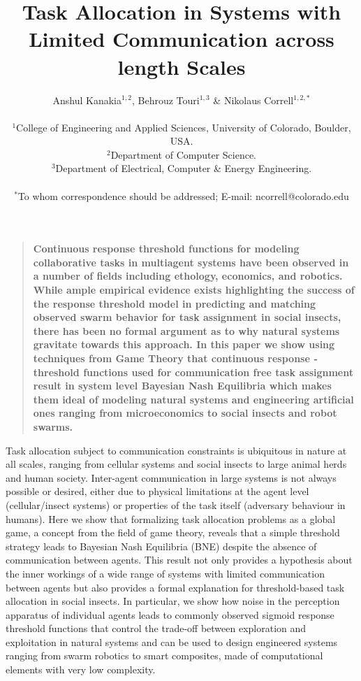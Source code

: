 \documentclass[12pt]{article}
\title{Task Allocation in Systems with Limited Communication across length Scales}
\author
{Anshul Kanakia$^{1,2}$, Behrouz Touri$^{1,3}$ \& Nikolaus Correll$^{1,2,\ast}$\\
\\
\normalsize{$^{1}$College of Engineering and Applied Sciences, University of Colorado, Boulder, USA. }\\
\normalsize{$^{2}$Department of Computer Science.}\\
\normalsize{$^{3}$Department of Electrical, Computer \& Energy Engineering.}\\
\\
\normalsize{$^\ast$To whom correspondence should be addressed; E-mail: ncorrell@colorado.edu}
}
\date{}
\newenvironment{sciabstract}{%
\begin{quote} \bf}
{\end{quote}}
\begin{document}
 


\baselineskip24pt


\maketitle 




\begin{sciabstract}
Continuous response ­threshold functions for modeling collaborative tasks in multi­agent systems have been observed in a number of fields including ethology, economics, and robotics. While ample empirical evidence exists highlighting the success of the response­ threshold model in predicting and matching observed swarm behavior for task ­assignment in social insects, there has been no formal argument as to why natural systems gravitate towards this approach. In this paper we show using techniques from Game Theory that continuous response ­threshold functions used for communication­ free task ­assignment result in system ­level Bayesian Nash Equilibria which makes them ideal of modeling natural systems and engineering artificial ones ranging from microeconomics to social insects and robot swarms. 
\end{sciabstract}

Task allocation subject to communication constraints is ubiquitous in nature at all scales, ranging from cellular systems\cite{Yoshida2010, Suzuki2015} and social insects\cite{Robinson1987, Gordon1996, Bonabeau1998, Theraulaz1998} to large animal herds\cite{Conradt2003, Conradt2005} and human society\cite{Raafat2009}. Inter-agent communication in large systems is not always possible or desired, either due to physical limitations at the agent level (cellular/insect systems) or properties of the task itself (adversary behaviour in humans). Here we show that formalizing task allocation problems as a global game, a concept from the field of game theory, reveals that a simple threshold strategy leads to Bayesian Nash Equilibria (BNE) despite the absence of communication between agents. This result not only provides a hypothesis about the inner workings of a wide range of systems with limited communication between agents but also provides a formal explanation for threshold-based task allocation in social insects. In particular, we show how noise in the perception apparatus of individual agents leads to commonly observed sigmoid response threshold functions that control the trade-off between exploration and exploitation\cite{Bonabeau1997} in natural systems and can be used to design engineered systems ranging from swarm robotics\cite{Martinoli1999, Krieger2000, Kube2000, Mataric2003, Gerkey2004} to smart composites\cite{McEvoy2015}, made of computational elements with very low complexity.
\end{document}
